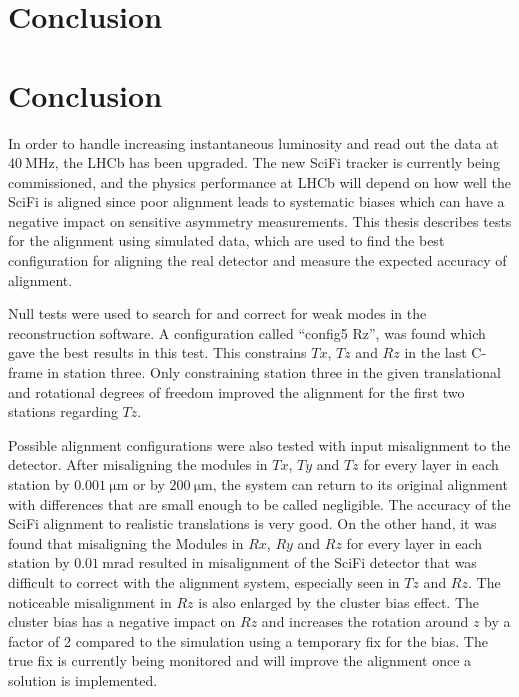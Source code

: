 \chapter{Conclusion}

\chapter{Conclusion}

In order to handle increasing instantaneous luminosity and read out the data at $\SI{40}{\mega\hertz}$, the LHCb has been upgraded. The new SciFi tracker is currently being commissioned, and the physics performance at LHCb will depend on how well the SciFi is aligned since poor alignment leads to systematic biases which can have a negative impact on sensitive asymmetry measurements. This thesis describes tests for the alignment using simulated data, which are used to find the best configuration for aligning the real detector and measure the expected accuracy of alignment.

Null tests were used to search for and correct for weak modes in the reconstruction software. A configuration called ``config5 Rz'', was found which gave the best results in this test. This constrains $Tx$, $Tz$ and $Rz$ in the last C-frame in station three.
Only constraining station three in the given translational and rotational degrees of freedom improved the alignment for the first two stations regarding $Tz$.

Possible alignment configurations were also tested with input misalignment to the detector. After misaligning the modules in $Tx$, $Ty$ and $Tz$ for every layer in each station by $\SI{0.001}{\micro\metre}$ or by $\SI{200}{\micro\metre}$, the system can return to its original alignment with differences that are small enough to be called negligible. The accuracy of the SciFi alignment to realistic translations is very good. On the other hand, it was found that misaligning the Modules in $Rx$, $Ry$ and $Rz$ for every layer in each station by $\SI{0.01}{\milli\radian}$ resulted in misalignment of the SciFi detector that was difficult to correct with the alignment system, especially seen in $Tz$ and $Rz$. The noticeable misalignment in $Rz$ is also enlarged by the cluster bias effect. The cluster bias has a negative impact on $Rz$ and increases the rotation around $z$ by a factor of 2 compared to the simulation using a temporary fix for the bias. The true fix is currently being monitored and will improve the alignment once a solution is implemented.

